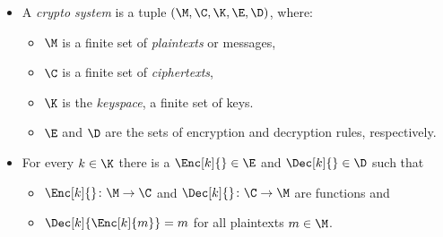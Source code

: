 \begin{frame}
  \begin{definition}\label{CryptoSystem}
    \begin{itemize}
        \item A \emph{crypto system} is a tuple \((\M, \C, \K, \E, \D)\), 
          where:
          \begin{itemize}
            \item \(\M\) is a finite set of \emph{plaintexts} or messages,
            \item \(\C\) is a finite set of \emph{ciphertexts},
            \item \(\K\) is the \emph{keyspace}, a finite set of keys.
            \item \(\E\) and \(\D\) are the sets of encryption and decryption
              rules, respectively.
          \end{itemize}

          \pause{}

        \item For every \(k\in \K\) there is a \(\Enc[k]{}\in \E\) and 
          \(\Dec[k]{}\in \D\) such that
          \begin{itemize}
            \item \(\Enc[k]{}\colon \M\to \C\) and \(\Dec[k]{}\colon \C\to 
                \M\) are functions and
            \item \(\Dec[k]{\Enc[k]{m}} = m\) for all plaintexts \(m\in 
                \M\).
          \end{itemize}
      \end{itemize}
  \end{definition}
\end{frame}

